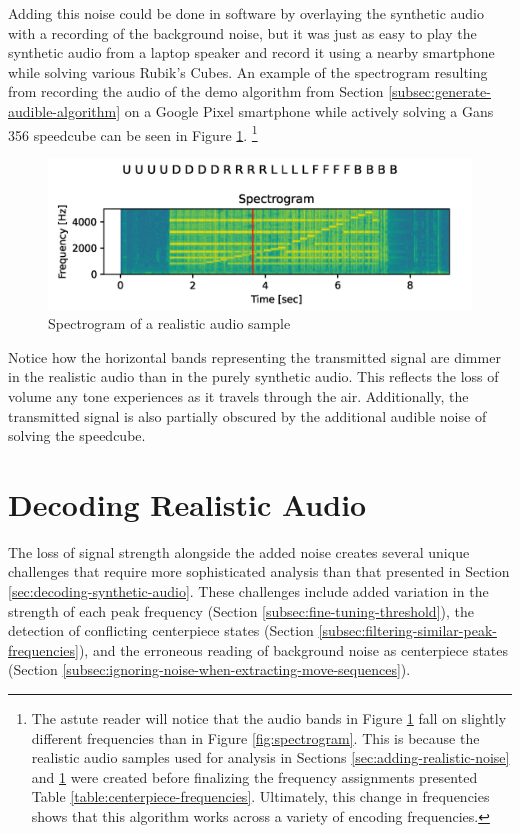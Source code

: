 Adding this noise could be done in software by overlaying the synthetic audio with a recording of the background noise, but it was just as easy to play the synthetic audio from a laptop speaker and record it using a nearby smartphone while solving various Rubik's Cubes.
An example of the spectrogram resulting from recording the audio of the demo algorithm from Section \ref{subsec:generate-audible-algorithm} on a Google Pixel smartphone while actively solving a Gans 356 speedcube can be seen in Figure \ref{fig:noisy-spectrogram}.
\footnote{The astute reader will notice that the audio bands in Figure \ref{fig:noisy-spectrogram} fall on slightly different frequencies than in Figure \ref{fig:spectrogram}. This is because the realistic audio samples used for analysis in Sections \ref{sec:adding-realistic-noise} and \ref{sec:decoding-realistic-noise} were created before finalizing the frequency assignments presented Table \ref{table:centerpiece-frequencies}. Ultimately, this change in frequencies shows that this algorithm works across a variety of encoding frequencies.}

\begin{figure}[h]
    \centering
    \caption{Spectrogram of a realistic audio sample}
    \label{fig:noisy-spectrogram}
    \includegraphics[width=0.8\linewidth]{Figures/5 Algorithm Design/transmitted-356-5tps.png}
\end{figure}

Notice how the horizontal bands representing the transmitted signal are dimmer in the realistic audio than in the purely synthetic audio.
This reflects the loss of volume any tone experiences as it travels through the air.
Additionally, the transmitted signal is also partially obscured by the additional audible noise of solving the speedcube.

\section{Decoding Realistic Audio}
\label{sec:decoding-realistic-noise}
The loss of signal strength alongside the added noise creates several unique challenges that require more sophisticated analysis than that presented in Section \ref{sec:decoding-synthetic-audio}.
These challenges include added variation in the strength of each peak frequency (Section \ref{subsec:fine-tuning-threshold}), the detection of conflicting centerpiece states (Section \ref{subsec:filtering-similar-peak-frequencies}), and the erroneous reading of background noise as centerpiece states (Section \ref{subsec:ignoring-noise-when-extracting-move-sequences}).

